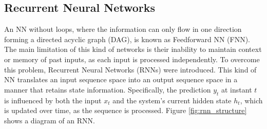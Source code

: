 \documentclass[11pt,english,listoffigures,listoftables]{tfgetsinf}
\begin{document}


\subsection{Recurrent Neural Networks}

An NN without loops, where the information can only flow in one direction forming a directed acyclic graph (DAG), is known as Feedforward NN (FNN). The main limitation of this kind of networks is their inability to maintain context or memory of past inputs, as each input is processed independently. To overcome this problem, Recurrent Neural Networks (RNNs) were introduced. This kind of NN translates an input sequence space into an output sequence space in a manner that retains state information. Specifically, the prediction $y_t$ at instant $t$ is influenced by both the input $x_t$ and the system's current hidden state $h_t$, which is updated over time, as the sequence is processed. Figure \ref{fig:rnn_structure} shows a diagram of an RNN.


\end{document}
